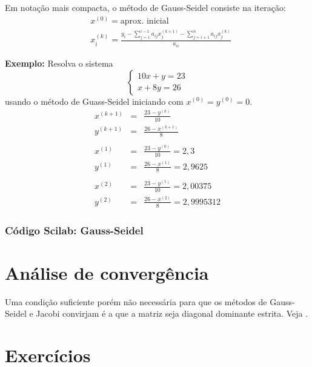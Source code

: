 Em notação mais compacta, o método de Gauss-Seidel consiste na iteração:
\begin{align*}
  &x^{(0)} = \text{aprox. inicial}\\
  &x_i^{(k)} = \frac{y_i - \displaystyle{\sum_{j=1}^{i-1} a_{ij}x_j^{(k+1)}} - \displaystyle{\sum_{j=i+1}^{n} a_{ij}x_j^{(k)}}}{a_{ii}}
\end{align*}


{\bf Exemplo:} Resolva o sistema $$\left\{\begin{array}{l}10x+y=23\\x+8y=26\end{array}\right.$$
usando o método de Guass-Seidel iniciando com $x^{(0)}=y^{(0)}=0$.
\begin{eqnarray*}
x^{(k+1)}&=&\frac{23-y^{(k)}}{10}\\
y^{(k+1)}&=&\frac{26-x^{(k+1)}}{8}\\
\\
x^{(1)}&=&\frac{23-y^{(0)}}{10}=2,3\\
y^{(1)}&=&\frac{26-x^{(1)}}{8}=2,9625\\
\\
x^{(2)}&=&\frac{23-y^{(1)}}{10}=2,00375  \\
y^{(2)}&=&\frac{26-x^{(2)}}{8}=2,9995312
\end{eqnarray*}

\ifisscilab
\subsubsection{Código Scilab: Gauss-Seidel}


\fi

\section{Análise de convergência}
Uma condição suficiente porém não necessária para que os métodos de Gauss-Seidel e Jacobi convirjam é a que a matriz seja diagonal dominante estrita. Veja \cite{Burden2013}.

\section*{Exercícios}

